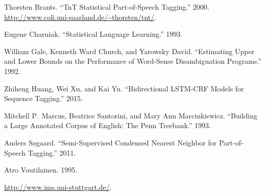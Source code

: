\documentclass{article}
\begin{document}
{%
\begin{thebibliography}{8}%
\label{sec-bibliography}%

Thorsten Brants. \textquotedblleft{}TnT \textendash{} Statistical Part-of-Speech Tagging.\textquotedblright{} 2000. \href{http://www.coli.uni-saarland.de/~thorsten/tnt/}{{\ttfamily http://\hspace{0pt}www.\hspace{0pt}coli.\hspace{0pt}uni-\hspace{0pt}saarland.\hspace{0pt}de/\hspace{0pt}\textasciitilde{}thorsten/\hspace{0pt}tnt/\hspace{0pt}}}.\label{brants2000}%

Eugene Charniak. \textquotedblleft{}Statistical Language Learning.\textquotedblright{} 1993.\label{charniak1993}%

William Gale, Kenneth Ward Church, and Yarowsky David. \textquotedblleft{}Estimating Upper and Lower Bounds on the Performance of Word-Sense Disambiguation Programs.\textquotedblright{} 1992.\label{gale1992}%

Zhiheng Huang, Wei Xu, and Kai Yu. \textquotedblleft{}Bidirectional LSTM-CRF Models for Sequence Tagging.\textquotedblright{} 2015.\label{huang2015}%

Mitchell P.~Marcus, Beatrice Santorini, and Mary Ann Marcinkiewicz. \textquotedblleft{}Building a Large Annotated Corpus of English: The Penn Treebank.\textquotedblright{} 1993.\label{marcus1993}%

Anders Søgaard. \textquotedblleft{}Semi-Supervised Condensed Nearest Neighbor for Part-of-Speech Tagging.\textquotedblright{} 2011.\label{sogaard2011}%

Atro Voutilainen. 1995.\label{voutilainen1995}%

 \href{http://www.ims.uni-stuttgart.de/}{{\ttfamily http://\hspace{0pt}www.\hspace{0pt}ims.\hspace{0pt}uni-\hspace{0pt}stuttgart.\hspace{0pt}de/\hspace{0pt}}}.\label{imsweb}%
\par%
\end{thebibliography}}%
\end{document}

